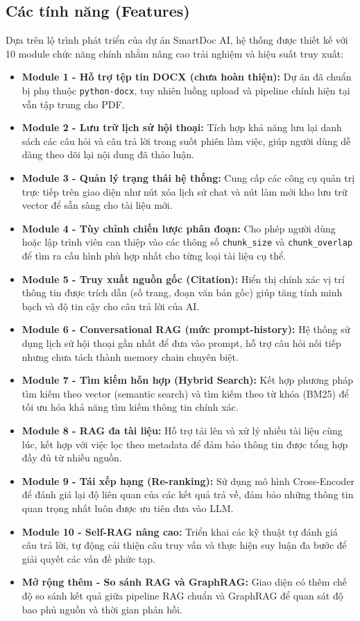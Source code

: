 \documentclass[conference]{IEEEtran}
\begin{document}
\subsection{Các tính năng (Features)}

Dựa trên lộ trình phát triển của dự án SmartDoc AI, hệ thống được thiết kế với 10 module chức năng chính nhằm nâng cao trải nghiệm và hiệu suất truy xuất:

\begin{itemize}
  \item \textbf{Module 1 - Hỗ trợ tệp tin DOCX (chưa hoàn thiện):} Dự án đã chuẩn bị phụ thuộc \texttt{python-docx}, tuy nhiên luồng upload và pipeline chính hiện tại vẫn tập trung cho PDF.
  \item \textbf{Module 2 - Lưu trữ lịch sử hội thoại:} Tích hợp khả năng lưu lại danh sách các câu hỏi và câu trả lời trong suốt phiên làm việc, giúp người dùng dễ dàng theo dõi lại nội dung đã thảo luận.
  \item \textbf{Module 3 - Quản lý trạng thái hệ thống:} Cung cấp các công cụ quản trị trực tiếp trên giao diện như nút xóa lịch sử chat và nút làm mới kho lưu trữ vector để sẵn sàng cho tài liệu mới.
  \item \textbf{Module 4 - Tùy chỉnh chiến lược phân đoạn:} Cho phép người dùng hoặc lập trình viên can thiệp vào các thông số \texttt{chunk\_size} và \texttt{chunk\_overlap} để tìm ra cấu hình phù hợp nhất cho từng loại tài liệu cụ thể.
  \item \textbf{Module 5 - Truy xuất nguồn gốc (Citation):} Hiển thị chính xác vị trí thông tin được trích dẫn (số trang, đoạn văn bản gốc) giúp tăng tính minh bạch và độ tin cậy cho câu trả lời của AI.
  \item \textbf{Module 6 - Conversational RAG (mức prompt-history):} Hệ thống sử dụng lịch sử hội thoại gần nhất để đưa vào prompt, hỗ trợ câu hỏi nối tiếp nhưng chưa tách thành memory chain chuyên biệt.
  \item \textbf{Module 7 - Tìm kiếm hỗn hợp (Hybrid Search):} Kết hợp phương pháp tìm kiếm theo vector (semantic search) và tìm kiếm theo từ khóa (BM25) để tối ưu hóa khả năng tìm kiếm thông tin chính xác.
  \item \textbf{Module 8 - RAG đa tài liệu:} Hỗ trợ tải lên và xử lý nhiều tài liệu cùng lúc, kết hợp với việc lọc theo metadata để đảm bảo thông tin được tổng hợp đầy đủ từ nhiều nguồn.
  \item \textbf{Module 9 - Tái xếp hạng (Re-ranking):} Sử dụng mô hình Cross-Encoder để đánh giá lại độ liên quan của các kết quả trả về, đảm bảo những thông tin quan trọng nhất luôn được ưu tiên đưa vào LLM.
  \item \textbf{Module 10 - Self-RAG nâng cao:} Triển khai các kỹ thuật tự đánh giá câu trả lời, tự động cải thiện câu truy vấn và thực hiện suy luận đa bước để giải quyết các vấn đề phức tạp.
  \item \textbf{Mở rộng thêm - So sánh RAG và GraphRAG:} Giao diện có thêm chế độ so sánh kết quả giữa pipeline RAG chuẩn và GraphRAG để quan sát độ bao phủ nguồn và thời gian phản hồi.
\end{itemize}
\end{document}
